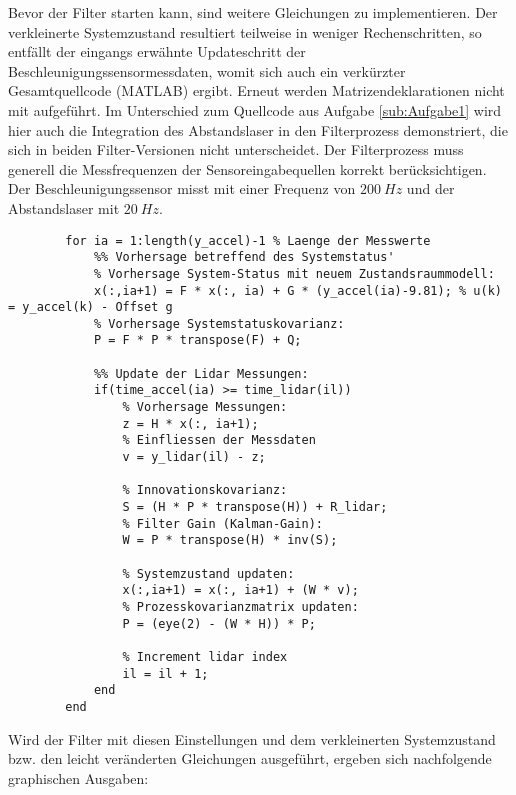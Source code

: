 \documentclass[12pt,a4paper]{article}
\begin{document}
\begin{enumerate}[label=\textbf{\arabic*})]
\begin{enumerate}[label=\textbf{\alph*})]
		Bevor der Filter starten kann, sind weitere Gleichungen zu implementieren. Der verkleinerte Systemzustand resultiert teilweise in weniger Rechenschritten, so entfällt der eingangs erwähnte Updateschritt der Beschleunigungssensormessdaten, womit sich auch ein verkürzter Gesamtquellcode (MATLAB) ergibt. Erneut werden Matrizendeklarationen nicht mit aufgeführt. Im Unterschied zum Quellcode aus Aufgabe \ref{sub:Aufgabe1} wird hier auch die Integration des Abstandslaser in den Filterprozess demonstriert, die sich in beiden Filter-Versionen nicht unterscheidet. Der Filterprozess muss generell die Messfrequenzen der Sensoreingabequellen korrekt berücksichtigen. Der Beschleunigungssensor misst mit einer Frequenz von $200~Hz$ und der Abstandslaser mit $20~Hz$.\\
		\begin{lstlisting}	
		for ia = 1:length(y_accel)-1 % Laenge der Messwerte
			%% Vorhersage betreffend des Systemstatus'
			% Vorhersage System-Status mit neuem Zustandsraummodell:
			x(:,ia+1) = F * x(:, ia) + G * (y_accel(ia)-9.81); % u(k) = y_accel(k) - Offset g
			% Vorhersage Systemstatuskovarianz:
			P = F * P * transpose(F) + Q;
			
			%% Update der Lidar Messungen:
			if(time_accel(ia) >= time_lidar(il))
				% Vorhersage Messungen:
				z = H * x(:, ia+1);
				% Einfliessen der Messdaten
				v = y_lidar(il) - z;
				
				% Innovationskovarianz:
				S = (H * P * transpose(H)) + R_lidar;
				% Filter Gain (Kalman-Gain):
				W = P * transpose(H) * inv(S);
				
				% Systemzustand updaten:
				x(:,ia+1) = x(:, ia+1) + (W * v);
				% Prozesskovarianzmatrix updaten:
				P = (eye(2) - (W * H)) * P;
				
				% Increment lidar index
				il = il + 1;
			end
		end
		\end{lstlisting}
		
		Wird der Filter mit diesen Einstellungen und dem verkleinerten Systemzustand bzw. den leicht veränderten Gleichungen ausgeführt, ergeben sich nachfolgende graphischen Ausgaben:
	\begin{figure}[!ht]
		

\end{figure}
\end{enumerate}
\end{enumerate}
\end{document}
